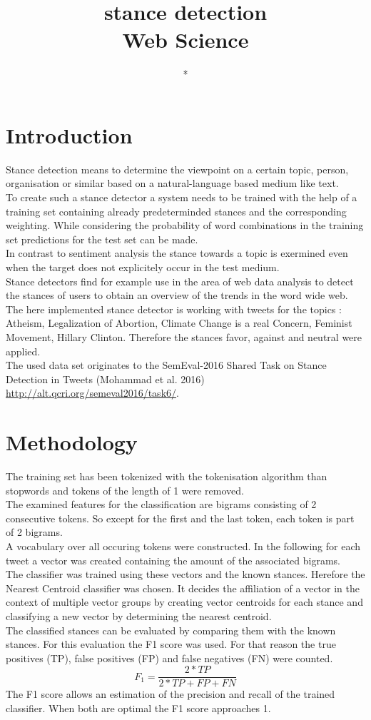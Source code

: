 \documentclass[a4paper,12pt,twoside]{article}
\title{stance detection\\ Web Science }
\author{*}
\begin{document}
\section{Introduction}
Stance detection means to determine the viewpoint on a certain topic, person, organisation or similar based on a natural-language based medium like text.\\ 
To create such a stance detector a system needs to be trained with the help of a training set containing already predeterminded stances and the corresponding weighting. While considering the probability of word combinations in the training set predictions for the test set can be made.\\
In contrast to sentiment analysis the stance towards a topic is exermined even when the target does not explicitely occur in the test medium. \\
Stance detectors find for example use in the area of web data analysis to detect the stances of users to obtain an overview of the trends in the word wide web. \\
The here implemented stance detector is working with tweets for the topics : Atheism, Legalization of Abortion, Climate Change is a real Concern, Feminist Movement, Hillary Clinton. Therefore the stances favor, against and neutral were applied.\\
The used data set originates to the SemEval-2016 Shared Task on Stance Detection in Tweets
(Mohammad et al. 2016) \url{http://alt.qcri.org/semeval2016/task6/}.



\section{Methodology}
The training set has been tokenized with the tokenisation algorithm than stopwords and tokens of the length of 1 were removed. \\
The examined features for the classification are bigrams consisting of 2 consecutive tokens. So except for the first and the last token, each token is part of 2 bigrams.\\
A vocabulary over all occuring tokens were constructed. In the following for each tweet a vector was created containing the amount of the associated bigrams.\\
The classifier was trained using these vectors and the known stances. Herefore the Nearest Centroid classifier was chosen. It decides the affiliation of a vector in the context of multiple vector groups by creating vector centroids for each stance and classifying a new vector by determining the nearest centroid.\\
The classified stances can be evaluated by comparing them with the known stances. For this evaluation the F1 score was used. For that reason the true positives (TP), false positives (FP) and false negatives (FN) were counted.
\begin{equation}
F_1 = \frac{2*TP}{ 2*TP + FP + FN}
\end{equation}
The F1 score allows an estimation of the precision and recall of the trained classifier. When both are optimal the F1 score approaches 1.
\end{document}
